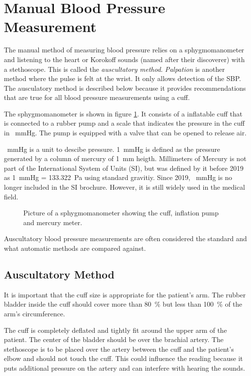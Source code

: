 \section{Manual Blood Pressure Measurement}
The manual method of measuring blood pressure relies on a sphygmomanometer and listening to the heart or Korokoff sounds (named after their discoverer) with a stethoscope. This is called the \emph{auscultatory method}. \emph{Palpation} is another method where the pulse is felt at the wrist. It only allows detection of the SBP. The ausculatory method is described below because it provides recommendations that are true for all blood pressure measurements using a cuff.

The sphygmomanometer is shown in figure \ref{fig:sphy}. It consists of a inflatable cuff that is connected to a rubber pump and a scale that indicates the pressure in the cuff in \SI{}{\mmHg}. The pump is equipped with a valve that can be opened to release air.


\SI{}{\mmHg} is a unit to descibe pressure. \SI{1}{\mmHg} is defined as the pressure generated by a column of mercury of \SI{1}{\mm} heigth. Millimeters of Mercury is not part of the International System of Units (SI), but was defined by it before 2019 as \SI{1}{\mmHg} = \SI{133.322}{\Pa} using standard gravitiy.\cite{SI2008} Since 2019, \SI{}{\mmHg} is no longer included in the SI brochure. However, it is still widely used in the medical field.


\begin{figure}[h]
\centering
\caption{Picture of a sphygmomanometer showing the cuff, inflation pump and mercury meter.}
\label{fig:sphy}
\end{figure}

Auscultatory blood pressure measurements are often considered the standard and what automatic methods are compared against. \cite{Sapinski1996}


\subsection{Auscultatory Method}
It is important that the cuff size is appropriate for the patient's arm. The rubber bladder inside the cuff should cover more than \SI{80}{\%} but less than \SI{100}{\%} of the arm's circumference.

The cuff is completely deflated and tightly fit around the upper arm of the patient. The center of the bladder should be over the brachial artery. The stethoscope is to be placed over the artery between the cuff and the patient's elbow and should not touch the cuff. This could influence the reading because it puts additional pressure on the artery and can interfere with hearing the sounds.\cite{NHS2019}\cite{Reeves1995}

